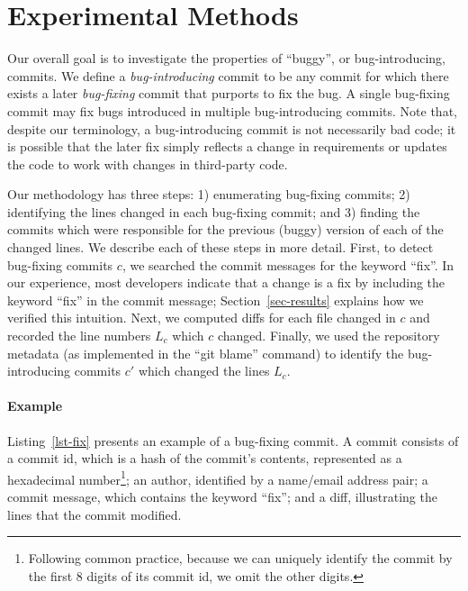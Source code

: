 \section{Experimental Methods}
\label{sec:method}
Our overall goal is to investigate the properties of ``buggy'', or
bug-introducing, commits. We define a \emph{bug-introducing} commit to be any
commit for which there exists a later \emph{bug-fixing} commit that purports to
fix the bug. A single bug-fixing commit may fix bugs introduced in
multiple bug-introducing commits. Note that, despite our terminology,
a bug-introducing commit is not necessarily bad code; it is possible 
that the later fix simply reflects a change in requirements or updates
the code to work with changes in third-party code.

Our methodology has three steps: 1) enumerating bug-fixing commits; 2)
identifying the lines changed in each bug-fixing commit; and 3)
finding the commits which were responsible for the previous (buggy)
version of each of the changed lines. We describe each of these steps
in more detail. First, to detect bug-fixing commits $c$, we searched
the commit messages for the keyword ``fix''. In our experience, most
developers indicate that a change is a fix by including the keyword
``fix'' in the commit message; Section~\ref{sec-results} explains how
we verified this intuition.  Next, we computed diffs for each file
changed in $c$ and recorded the line numbers $L_c$ which $c$
changed. Finally, we used the repository metadata (as implemented in
the ``git blame'' command) to identify the bug-introducing commits
$c'$ which changed the lines $L_c$.

\paragraph{Example} Listing~\ref{lst-fix} presents an example of a
bug-fixing commit. A commit consists of a commit id, which is a hash
of the commit's contents, represented as a hexadecimal number\footnote{Following common practice, because we can uniquely identify the commit by the first 8 digits of its commit id, we omit the other digits.}; an
author, identified by a name/email address pair; a commit message,
which contains the keyword ``fix''; and a diff, illustrating the lines
that the commit modified. 

